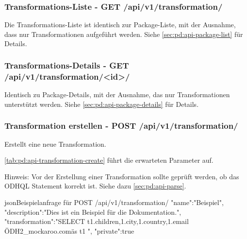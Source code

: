 \subsubsection{Transformations-Liste - GET /api/v1/transformation/}
Die Transformations-Liste ist identisch zur Package-Liste, mit der Ausnahme, dass nur Transformationen aufgeführt werden. Siehe \cref{sec:pd:api-package-list} für Details.

\subsubsection{Transformations-Details - GET /api/v1/transformation/<id>/}
Identisch zu Package-Details, mit der Ausnahme, das nur Transformationen unterstützt werden. Siehe \cref{sec:pd:api-package-details} für Details.

\subsubsection{Transformation erstellen - POST /api/v1/transformation/}
Erstellt eine neue Transformation.

\cref{tab:pd:api-transformation-create} führt die erwarteten Parameter auf.

Hinweis: Vor der Erstellung einer Transformation sollte geprüft werden, ob das ODHQL Statement korrekt ist. Siehe dazu \cref{sec:pd:api-parse}.

\begin{srclst}{json}{Beispielanfrage für POST /api/v1/transformation/}
{
  "name":"Beispiel",
  "description":"Dies ist ein Beispiel für die Dokumentation.",
  "transformation":"SELECT t1.children,\nt1.city,\nt1.country,\nt1.email \nFROM \"ODH2_mockaroo.com\" as t1 \n",
  "private":true
}
\end{srclst}

